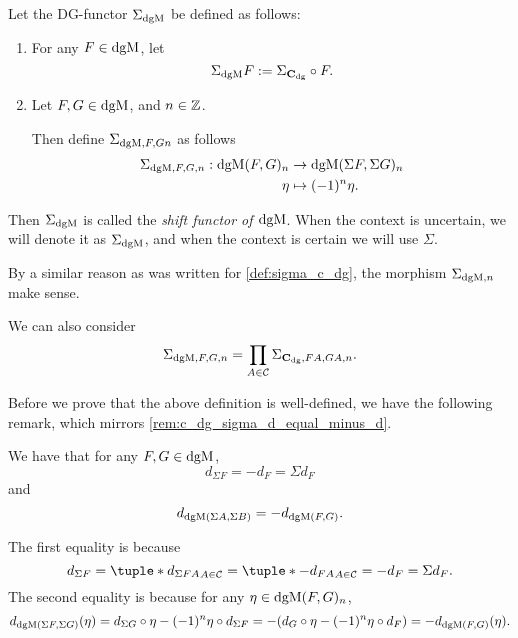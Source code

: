\begin{definition}
    \label{def:sigma_dgmod}
    Let the DG-functor \( \Sigma_{\operatorname{dgM}} \) be defined as follows:
    \begin{enumerate}
        \item {
            For any \( F \in \operatorname{dgM} \), let
            \[
                \Sigma_{\operatorname{dgM}} F := \Sigma_{\operatorname{\mathbf{C}}_{\operatorname{dg}}} \circ F.
            \]
        }
        \item {
            Let \( F, G \in \operatorname{dgM} \), and \( n \in {\mathbb{Z}} \).
            
            Then define \( \Sigma_{\operatorname{dgM}, F, G n} \) as follows
            \begin{align*}
                \Sigma_{\operatorname{dgM}, F, G, n}: \operatorname{dgM}(F, G)_n &\to \operatorname{dgM}(\Sigma F, \Sigma G)_n \\
                \eta &\mapsto (-1)^n \eta.
            \end{align*}
        }
    \end{enumerate}
    Then \( \Sigma_{\operatorname{dgM}} \) is called the \emph{shift functor of \( \operatorname{dgM} \)}. When the context is uncertain, we will denote it as \( \Sigma_{\operatorname{dgM}} \), and when the context is certain we will use \( \Sigma \).
\end{definition}

By a similar reason as was written for \autoref{def:sigma_c_dg}, the morphism \( \Sigma_{\operatorname{dgM}, n} \) make sense.

We can also consider
\[
    \Sigma_{\operatorname{dgM}, F, G, n} = \prod_{A \in {\mathcal{C}}} \Sigma_{\operatorname{\mathbf{C}}_{\operatorname{dg}}, F A, G A, n}.
\] 

Before we prove that the above definition is well-defined, we have the following remark, which mirrors \autoref{rem:c_dg_sigma_d_equal_minus_d}.

\begin{remark}
    We have that for any \( F, G \in \operatorname{dgM} \),
    \[
        d_{\Sigma F} = -d_F = \Sigma d_F
    \]
    and
    \[
        d_{\operatorname{dgM}(\Sigma A, \Sigma B)} = - d_{\operatorname{dgM}(F, G)}.
    \]

    The first equality is because
    \[
        d_{\Sigma F} = \tuple*{d_{\Sigma F A}}_{A \in \Cc} = \tuple*{-d_{F A}}_{A \in \Cc} = - d_F = \Sigma d_F.
    \]
    The second equality is because for any \( \eta \in \operatorname{dgM}(F, G)_n \),
    \[
        d_{\operatorname{dgM}(\Sigma F, \Sigma G)} (\eta) = d_{\Sigma G} \circ \eta - (-1)^n \eta \circ d_{\Sigma F} = - (d_G \circ \eta - (-1)^n \eta \circ d_F) = - d_{\operatorname{dgM}(F, G)} (\eta).
    \]
\end{remark}

